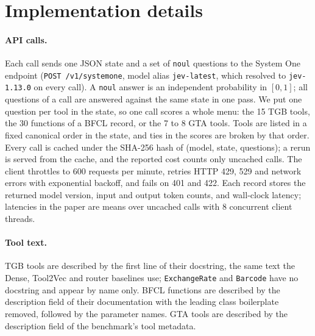 \documentclass[11pt]{tea}
\newcommand{\tool}[1]{\texttt{#1}}
\begin{document}
\section{Implementation details}
\label{app:impl}

\paragraph{API calls.}
Each call sends one JSON state and a set of \texttt{noul} questions to the System One endpoint (\texttt{POST /v1/systemone}, model alias \texttt{jev-latest}, which resolved to \texttt{jev-1.13.0} on every call). A \texttt{noul} answer is an independent probability in $[0,1]$; all questions of a call are answered against the same state in one pass. We put one question per tool in the state, so one call scores a whole menu: the 15 TGB tools, the 30 functions of a BFCL record, or the 7 to 8 GTA tools. Tools are listed in a fixed canonical order in the state, and ties in the scores are broken by that order. Every call is cached under the SHA-256 hash of (model, state, questions); a rerun is served from the cache, and the reported cost counts only uncached calls. The client throttles to 600 requests per minute, retries HTTP 429, 529 and network errors with exponential backoff, and fails on 401 and 422. Each record stores the returned model version, input and output token counts, and wall-clock latency; latencies in the paper are means over uncached calls with 8 concurrent client threads.

\paragraph{Tool text.}
TGB tools are described by the first line of their docstring, the same text the Dense, Tool2Vec and router baselines use; \tool{ExchangeRate} and \tool{Barcode} have no docstring and appear by name only. BFCL functions are described by the description field of their documentation with the leading class boilerplate removed, followed by the parameter names. GTA tools are described by the description field of the benchmark's tool metadata.
\end{document}

